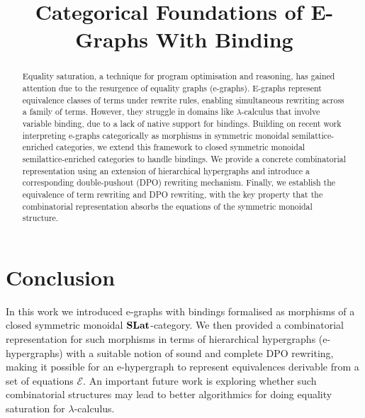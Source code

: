 \documentclass[acmsmall,screen, nonacm, review, anonymous]{acmart}
\title{Categorical Foundations of E-Graphs With Binding}
\begin{document}
\begin{abstract}
	Equality saturation, a technique for program optimisation and reasoning, has gained attention due to the resurgence of equality graphs (e-graphs).
	E-graphs represent equivalence classes of terms under rewrite rules, enabling simultaneous rewriting across a family of terms.
	However, they struggle in domains like $\lambda$-calculus that involve variable binding, due to a lack of native support for bindings.
	Building on recent work interpreting e-graphs categorically as morphisms in symmetric monoidal semilattice-enriched categories, we extend this framework to closed symmetric monoidal semilattice-enriched categories to handle bindings.
	We provide a concrete combinatorial representation using an extension of hierarchical hypergraphs and introduce a corresponding double-pushout (DPO) rewriting mechanism.
	Finally, we establish the equivalence of term rewriting and DPO rewriting, with the key property that the combinatorial representation absorbs the equations of the symmetric monoidal structure.
\end{abstract}

\maketitle







\section{Conclusion}
In this work we introduced e-graphs with bindings formalised as morphisms of a closed symmetric monoidal $\mathbf{SLat}$-category.
We then provided a combinatorial representation for such morphisms in terms of hierarchical hypergraphs (e-hypergraphs) with a suitable notion of sound and complete DPO rewriting, making it possible for an e-hypergraph to represent equivalences derivable from a set of equations $\mathcal{E}$.
An important future work is exploring whether such combinatorial structures may lead to better algorithmics for doing equality saturation for $\lambda$-calculus.




\appendix


\end{document}
